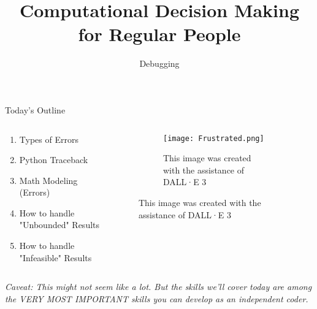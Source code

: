\documentclass[10pt, aspectratio=169]{beamer}
\title{Computational Decision Making for Regular People}
\subtitle{Debugging}
\begin{document}
\begin{frame}
    \maketitle
\end{frame}

\begin{frame}{Today's Outline}
    \begin{columns}
        \begin{column}{0.5\textwidth}
            \begin{enumerate}
                \item Types of Errors
                \item Python Traceback
                \item Math Modeling (Errors)
                \item How to handle "Unbounded" Results
                \item How to handle "Infeasible" Results
            \end{enumerate}
        \end{column}
        \begin{column}{0.5\textwidth}
            \begin{figure}
                \begin{figure}
                    \texttt{[image: Frustrated.png]}
                    \caption{This image was created with the assistance of DALL·E 3}
                \end{figure}
            \end{figure}
        \end{column}
    \end{columns}
    \textit{Caveat: This might not seem like a lot. But the skills we'll cover today are among the VERY MOST IMPORTANT skills you can develop as an independent coder.}
\end{frame}
\end{document}
